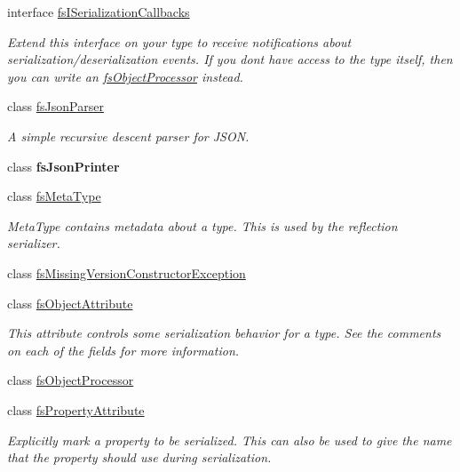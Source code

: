\begin{DoxyCompactItemize}
interface \hyperlink{interface_full_serializer_1_1fs_i_serialization_callbacks}{fs\+I\+Serialization\+Callbacks}
\begin{DoxyCompactList}\small\item\em Extend this interface on your type to receive notifications about serialization/deserialization events. If you don\textquotesingle{}t have access to the type itself, then you can write an \hyperlink{class_full_serializer_1_1fs_object_processor}{fs\+Object\+Processor} instead. \end{DoxyCompactList}\item 
class \hyperlink{class_full_serializer_1_1fs_json_parser}{fs\+Json\+Parser}
\begin{DoxyCompactList}\small\item\em A simple recursive descent parser for J\+S\+ON. \end{DoxyCompactList}\item 
class {\bfseries fs\+Json\+Printer}
\item 
class \hyperlink{class_full_serializer_1_1fs_meta_type}{fs\+Meta\+Type}
\begin{DoxyCompactList}\small\item\em Meta\+Type contains metadata about a type. This is used by the reflection serializer. \end{DoxyCompactList}\item 
class \hyperlink{class_full_serializer_1_1fs_missing_version_constructor_exception}{fs\+Missing\+Version\+Constructor\+Exception}
\item 
class \hyperlink{class_full_serializer_1_1fs_object_attribute}{fs\+Object\+Attribute}
\begin{DoxyCompactList}\small\item\em This attribute controls some serialization behavior for a type. See the comments on each of the fields for more information. \end{DoxyCompactList}\item 
class \hyperlink{class_full_serializer_1_1fs_object_processor}{fs\+Object\+Processor}
\item 
class \hyperlink{class_full_serializer_1_1fs_property_attribute}{fs\+Property\+Attribute}
\begin{DoxyCompactList}\small\item\em Explicitly mark a property to be serialized. This can also be used to give the name that the property should use during serialization. \end{DoxyCompactList}\item 

\end{DoxyCompactItemize}
